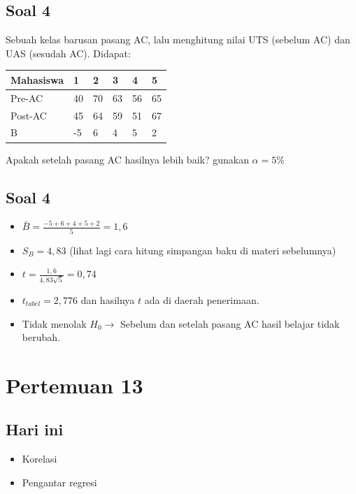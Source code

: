 \documentclass[
  letterpaper,
  DIV=11,
  numbers=noendperiod]{scrartcl}
\begin{document}
\hypertarget{soal-4}{%
\subsection{Soal 4}\label{soal-4}}

Sebuah kelas barusan pasang AC, lalu menghitung nilai UTS (sebelum AC)
dan UAS (sesudah AC). Didapat:

\begin{longtable}[]{@{}llllll@{}}
\toprule\noalign{}
Mahasiswa & 1 & 2 & 3 & 4 & 5 \\
\midrule\noalign{}
\endhead
\bottomrule\noalign{}
\endlastfoot
Pre-AC & 40 & 70 & 63 & 56 & 65 \\
Post-AC & 45 & 64 & 59 & 51 & 67 \\
B & -5 & 6 & 4 & 5 & 2 \\
\end{longtable}

Apakah setelah pasang AC hasilnya lebih baik? gunakan \(\alpha=5\%\)

\hypertarget{soal-4-1}{%
\subsection{Soal 4}\label{soal-4-1}}

\begin{itemize}
\item
  \(\bar{B}=\frac{-5+6+4+5+2}{5}=1,6\)
\item
  \(S_B=4,83\) (lihat lagi cara hitung simpangan baku di materi
  sebelumnya)
\item
  \(t=\frac{1,6}{4,83\sqrt{5}}=0,74\)
\item
  \(t_{tabel}=2,776\) dan hasilnya \(t\) ada di daerah penerimaan.
\item
  Tidak menolak \(H_0 \rightarrow\) Sebelum dan setelah pasang AC hasil
  belajar tidak berubah.
\end{itemize}

\hypertarget{pertemuan-13}{%
\section{Pertemuan 13}\label{pertemuan-13}}

\hypertarget{hari-ini-3}{%
\subsection{Hari ini}\label{hari-ini-3}}

\begin{itemize}
\item
  Korelasi
\item
  Pengantar regresi
\end{itemize}
\end{document}
